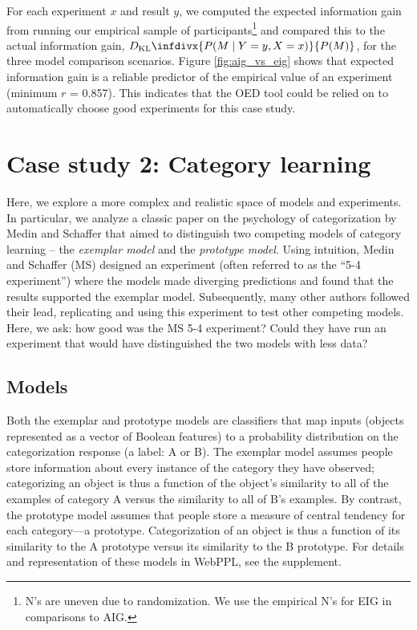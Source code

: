 \documentclass{article}
\newcommand{\dkl}{D_\mathrm{KL}\infdivx}
\begin{document}
For each experiment $x$ and result $y$, we computed the expected information gain from running our empirical sample of participants\footnote{N's are uneven due to randomization. We use the empirical N's for EIG in comparisons to AIG.} and compared this to the actual information gain, $\dkl{P(M \mid Y = y, X = x)}{P(M)}$, for the three model comparison scenarios.
Figure \ref{fig:aig_vs_eig} shows that expected information gain is a reliable predictor of the empirical value of an experiment (minimum $r$ = 0.857). This indicates that the OED tool could be relied on to automatically choose good experiments for this case study.


\section{Case study 2: Category learning}

Here, we explore a more complex and realistic space of models and experiments.
In particular, we analyze a classic paper on the psychology of categorization by Medin and Schaffer \cite{medin78:pr} that aimed to distinguish two competing models of category learning -- the \emph{exemplar model} and the \emph{prototype model}.
Using intuition, Medin and Schaffer (MS) designed an experiment (often referred to as the ``5-4 experiment'') where the models made diverging predictions and found that the results supported the exemplar model.
Subsequently, many other authors followed their lead, replicating and using this experiment to test other competing models.
Here, we ask: how good was the MS 5-4 experiment?
Could they have run an experiment that would have distinguished the two models with less data?




\subsection{Models}

Both the exemplar and prototype models are classifiers that map inputs (objects represented as a vector of Boolean features) to a probability distribution on the categorization response (a label: A or B).
The exemplar model assumes people store information about every instance of the category they have observed; categorizing an object is thus a function of the object's similarity to all of the examples of category A versus the similarity to all of B's examples.
By contrast, the prototype model assumes that people store a measure of central tendency for each category---a prototype.
Categorization of an object is thus a function of its similarity to the A prototype versus its similarity to the B prototype.
For details and representation of these models in WebPPL, see the supplement.
\end{document}
